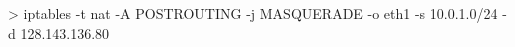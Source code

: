 \begin{cmdblock}
> iptables -t nat -A POSTROUTING -j MASQUERADE -o eth1 -s 10.0.1.0/24 -d 128.143.136.80
\end{cmdblock}
